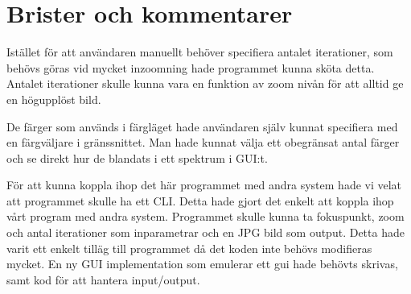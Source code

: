 \documentclass[a4paper]{article}
\begin{document}
\section{Brister och kommentarer}
Istället för att användaren manuellt behöver specifiera antalet iterationer, som behövs göras vid mycket inzoomning hade programmet kunna sköta detta. Antalet iterationer skulle kunna vara en funktion av zoom nivån för att alltid ge en högupplöst bild.

De färger som används i färgläget hade användaren själv kunnat specifiera med en färgväljare i gränssnittet. Man hade kunnat välja ett obegränsat antal färger och se direkt hur de blandats i ett spektrum i GUI:t.

För att kunna koppla ihop det här programmet med andra system hade vi velat att programmet skulle ha ett CLI. Detta hade gjort det enkelt att koppla ihop vårt program med andra system. Programmet skulle kunna ta fokuspunkt, zoom och antal iterationer som inparametrar och en JPG bild som output. Detta hade varit ett enkelt tilläg till programmet då det koden inte behövs modifieras mycket. En ny GUI implementation som emulerar ett gui hade behövts skrivas, samt kod för att hantera input/output.
\newline
\newline
\end{document}
